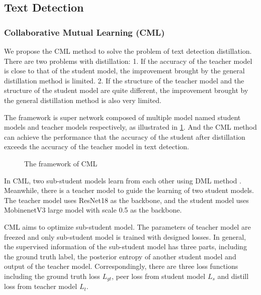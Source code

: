 \documentclass[letterpaper]{article} %
\begin{document}
\subsection{Text Detection}
\subsubsection{Collaborative Mutual Learning (CML)}
We propose the CML method \cite{dml2017} to solve the problem of text detection distillation. There are two problems with distillation:
1. If the accuracy of the teacher model is close to that of the student model, the improvement brought by the general distillation method is limited.
2. If the structure of the teacher model and the structure of the student model are quite different, the improvement brought by the general distillation method is also very limited.

The framework is super network composed of multiple model named student models and teacher models respectively, as illustrated in \ref{cml_framework}. And the CML method can achieve the performance that the accuracy of the student after distillation exceeds the accuracy of the teacher model in text detection. 

\begin{figure}[h!]
\centering
{}
\caption{The framework of CML}
\label{cml_framework}
\end{figure}

In CML, two sub-student models learn from each other using DML method \cite{dml2017}. Meanwhile, there is a teacher model to guide the learning of two student models. The teacher model uses ResNet18 as the backbone, and the student model uses MobinenetV3 large model with scale 0.5 as the backbone. 

CML aims to optimize sub-student model. The parameters of teacher model are freezed and only sub-student model is trained with designed losses. 
In general, the supervised information of the sub-student model has three parts, including the ground truth label, the posterior entropy of another student model and output of the teacher model. Correspondingly, there are three loss functions including the ground truth loss $L_{gt}$, peer loss from student model $L_{s}$ and distill loss from teacher model $L_{t}$.
\end{document}
